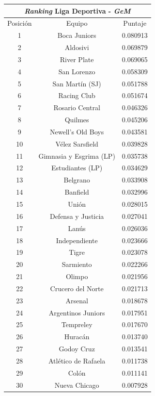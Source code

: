 				\begin{center}
	      			\begin{tabular}{|c|c|c|} 
			      		\hline
			  				\multicolumn{3}{c}{\emph{Ranking} Liga Deportiva - \emph{GeM}} \\
			 			\hline
	        			Posición & Equipo & Puntaje \\ \hline
	         			1 & Boca Juniors & 0.080913 \\
	        			2 & Aldosivi & 0.069879 \\
	        			3 & River Plate & 0.069065 \\
	        			4 & San Lorenzo & 0.058309 \\
	        			5 & San Martín (SJ) & 0.051788 \\
	        			6 & Racing Club & 0.051674 \\
	        			7 & Rosario Central & 0.046326 \\
	        			8 & Quilmes & 0.045206 \\
	        			9 & Newell's Old Boys & 0.043581 \\
	        			10 & Vélez Sarsfield & 0.039828 \\
	        			11 & Gimnasia y Esgrima (LP) & 0.035738 \\
	        			12 & Estudiantes (LP) & 0.034629 \\
	        			13 & Belgrano & 0.033908 \\
	        			14 & Banfield & 0.032996 \\
	        			15 & Unión & 0.028015 \\
	        			16 & Defensa y Justicia & 0.027041 \\
	        			17 & Lanús & 0.026036 \\
	   					18 & Independiente & 0.023666 \\
	   					19 & Tigre & 0.023078 \\
	   					20 & Sarmiento & 0.022266 \\
	   					21 & Olimpo & 0.021956 \\
	   					22 & Crucero del Norte & 0.021713 \\
	  					23 & Arsenal & 0.018678 \\
	   					24 & Argentinos Juniors & 0.017951 \\
	   					25 & Tempreley & 0.017670 \\
	   					26 & Huracán & 0.013740 \\
	   					27 & Godoy Cruz & 0.013541 \\
	   					28 & Atlético de Rafaela & 0.011738 \\
	   					29 & Colón & 0.011141 \\
	   					30 & Nueva Chicago & 0.007928 


\end{tabular}
\end{center}
